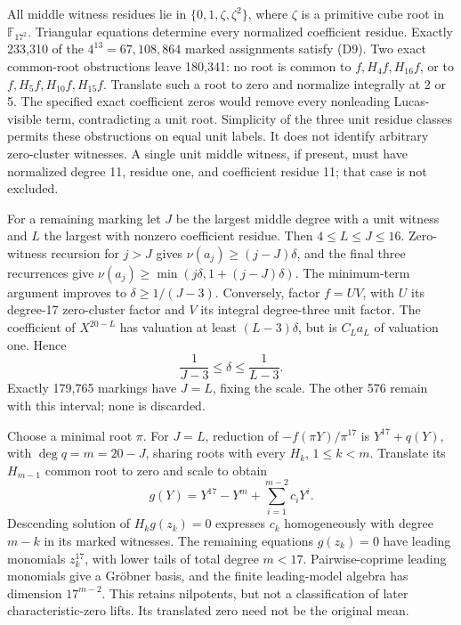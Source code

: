 \documentclass[
  british,
  10pt,
]{article}
\newcounter{none} %
\begin{document}
All middle witness residues lie in \(\{0,1,\zeta,\zeta^2\}\), where
\(\zeta\) is a primitive cube root in \(\mathbb F_{17^2}\). Triangular
equations determine every normalized coefficient residue. Exactly
233,310 of the \(4^{13}=67,108,864\) marked assignments satisfy (D9).
Two exact common-root obstructions leave 180,341: no root is common to
\(f,H_4f,H_{16}f\), or to \(f,H_5f,H_{10}f,H_{15}f\). Translate such a
root to zero and normalize integrally at 2 or 5. The specified exact
coefficient zeros would remove every nonleading Lucas-visible term,
contradicting a unit root. Simplicity of the three unit residue classes
permits these obstructions on equal unit labels. It does not identify
arbitrary zero-cluster witnesses. A single unit middle witness, if
present, must have normalized degree 11, residue one, and coefficient
residue 11; that case is not excluded.

For a remaining marking let \(J\) be the largest middle degree with a
unit witness and \(L\) the largest with nonzero coefficient residue.
Then \(4\le L\le J\le16\). Zero-witness recursion for \(j>J\) gives
\(\nu(a_j)\ge(j-J)\delta\), and the final three recurrences give
\(\nu(a_j)\ge\min(j\delta,1+(j-J)\delta)\). The minimum-term argument
improves to \(\delta\ge1/(J-3)\). Conversely, factor \(f=UV\), with
\(U\) its degree-17 zero-cluster factor and \(V\) its integral
degree-three unit factor. The coefficient of \(X^{20-L}\) has valuation
at least \((L-3)\delta\), but is \(C_La_L\) of valuation one. Hence \[
 \frac1{J-3}\le\delta\le\frac1{L-3}.                      \tag{D10}
\] Exactly 179,765 markings have \(J=L\), fixing the scale. The other
576 remain with this interval; none is discarded.

Choose a minimal root \(\pi\). For \(J=L\), reduction of
\(-f(\pi Y)/\pi^{17}\) is \(Y^{17}+q(Y)\), with \(\deg q=m=20-J\),
sharing roots with every \(H_k\), \(1\le k<m\). Translate its
\(H_{m-1}\) common root to zero and scale to obtain \[
 g(Y)=Y^{17}-Y^m+\sum_{i=1}^{m-2}c_iY^i.
\] Descending solution of \(H_kg(z_k)=0\) expresses \(c_k\)
homogeneously with degree \(m-k\) in its marked witnesses. The remaining
equations \(g(z_k)=0\) have leading monomials \(z_k^{17}\), with lower
tails of total degree \(m<17\). Pairwise-coprime leading monomials give
a Gröbner basis, and the finite leading-model algebra has dimension
\(17^{m-2}\). This retains nilpotents, but not a classification of later
characteristic-zero lifts. Its translated zero need not be the original
mean.
\end{document}

